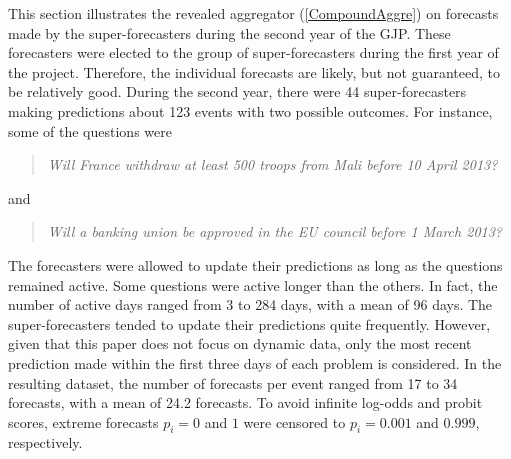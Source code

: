 \documentclass[11pt]{article}
\theoremstyle{definition}
\theoremstyle{definition}
\begin{document}
This section illustrates the revealed aggregator (\ref{CompoundAggre})
on forecasts made by the super-forecasters during the second year of the GJP. These forecasters were
elected to the group of super-forecasters during the first year of the project. 
Therefore, the individual forecasts are
likely, but not guaranteed, to be relatively good. During the second year, there were 44 super-forecasters making predictions about 123 events with two possible outcomes. For instance, some of
the questions were
\begin{quote}\textit{
Will France withdraw at least 500 troops from Mali before 10 April 2013?
}\end{quote}
and
\begin{quote}\textit{
Will a banking union be approved in the EU council before 1 March 2013? 
}
\end{quote}
 The forecasters were allowed to update their predictions as long as the
questions remained active. Some questions were active longer than the
others. In fact, the number of active days ranged from 3 to 284 days,
with a mean of 96 days. The super-forecasters tended to update their predictions quite frequently. However, given that this paper does not focus on dynamic
data, only the most recent prediction made within the first three days of each problem is considered.  
In the resulting
dataset, the number of forecasts per event ranged from 17 to 34
forecasts, with a mean of 24.2 forecasts. To avoid infinite log-odds
and probit scores, extreme forecasts $p_i = 0$ and $1$ were
censored to $p_i = 0.001$ and $0.999$, respectively.
 
\end{document}
